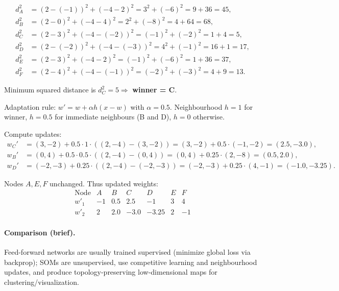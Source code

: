 \documentclass[11pt,a4paper]{article}
\begin{document}
\[
\begin{aligned}
d_A^2 &= (2-(-1))^2 + (-4-2)^2 = 3^2 + (-6)^2=9+36=45,\\
d_B^2 &= (2-0)^2 + (-4-4)^2 = 2^2 + (-8)^2=4+64=68,\\
d_C^2 &= (2-3)^2 + (-4-(-2))^2 = (-1)^2 + (-2)^2=1+4=5,\\
d_D^2 &= (2-(-2))^2 + (-4-(-3))^2 = 4^2 + (-1)^2=16+1=17,\\
d_E^2 &= (2-3)^2 + (-4-2)^2 = (-1)^2 + (-6)^2=1+36=37,\\
d_F^2 &= (2-4)^2 + (-4-(-1))^2 = (-2)^2 + (-3)^2=4+9=13.
\end{aligned}
\]

Minimum squared distance is \(d_C^2=5\Rightarrow\) \textbf{winner = C}.

Adaptation rule: \(w' = w + \alpha h (x-w)\) with \(\alpha=0.5\). Neighbourhood \(h=1\) for winner, \(h=0.5\) for immediate neighbours (B and D), \(h=0\) otherwise.

Compute updates:
\[
\begin{aligned}
w_C' &= (3,-2) + 0.5\cdot 1\cdot((2,-4)-(3,-2))=(3,-2)+0.5\cdot(-1,-2)=(2.5,-3.0),\\
w_B' &= (0,4) + 0.5\cdot 0.5\cdot((2,-4)-(0,4))=(0,4)+0.25\cdot(2,-8)=(0.5,2.0),\\
w_D' &= (-2,-3) + 0.25\cdot((2,-4)-(-2,-3))=(-2,-3)+0.25\cdot(4,-1)=(-1.0,-3.25).
\end{aligned}
\]

Nodes \(A,E,F\) unchanged. Thus updated weights:
\[
\begin{array}{c|rrrrrr}
\text{Node} & A & B & C & D & E & F\\\hline
w'_1 & -1 & 0.5 & 2.5 & -1 & 3 & 4\\
w'_2 & 2 & 2.0 & -3.0 & -3.25 & 2 & -1
\end{array}
\]

\paragraph{Comparison (brief).} Feed-forward networks are usually trained supervised (minimize global loss via backprop); SOMs are unsupervised, use competitive learning and neighbourhood updates, and produce topology-preserving low-dimensional maps for clustering/visualization.
\end{document}
